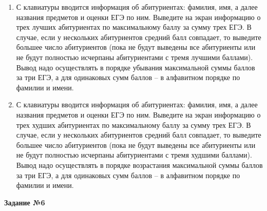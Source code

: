 \begin{enumerate}
	\item С клавиатуры вводится информация об абитуриентах: фамилия, имя, а далее названия предметов и оценки ЕГЭ по ним. Выведите на экран информацию о трех лучших абитуриентах по максимальному баллу за сумму трех ЕГЭ. В случае,
		если у нескольких абитуриентов средний балл совпадает, то выведите большее число абитуриентов (пока не будут выведены все абитуриенты или 
		не будут полностью исчерпаны абитуриентами с тремя лучшими баллами). Вывод надо осуществлять в порядке убывания максимальной суммы
		баллов за три ЕГЭ, а 
		для одинаковых сумм баллов -- в алфавитном порядке по фамилии и имени.
	\item С клавиатуры вводится информация об абитуриентах: фамилия, имя, а далее названия предметов и оценки ЕГЭ по ним. Выведите на экран информацию о трех худших абитуриентах по максимальному баллу за сумму трех ЕГЭ. В случае,
		если у нескольких абитуриентов средний балл совпадает, то выведите большее число абитуриентов (пока не будут выведены все абитуриенты или 
		не будут полностью исчерпаны абитуриентами с тремя худшими баллами). Вывод надо осуществлять в порядке возрастания максимальной суммы
		баллов за три ЕГЭ, а 
		для одинаковых сумм баллов -- в алфавитном порядке по фамилии и имени.
\end{enumerate}

\textbf{Задание №6}

